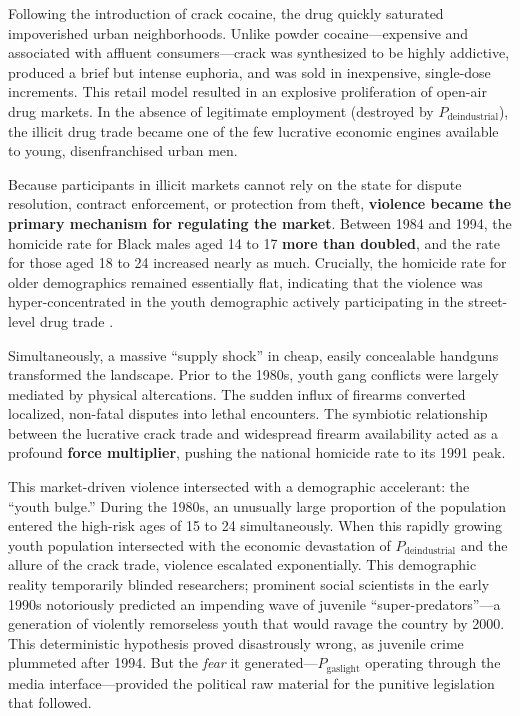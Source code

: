 \documentclass[12pt,openany]{book}
\begin{document}
Following the introduction of crack cocaine, the drug quickly saturated impoverished urban neighborhoods. Unlike powder cocaine---expensive and associated with affluent consumers---crack was synthesized to be highly addictive, produced a brief but intense euphoria, and was sold in inexpensive, single-dose increments. This retail model resulted in an explosive proliferation of open-air drug markets. In the absence of legitimate employment (destroyed by $P_{\text{deindustrial}}$), the illicit drug trade became one of the few lucrative economic engines available to young, disenfranchised urban men.

Because participants in illicit markets cannot rely on the state for dispute resolution, contract enforcement, or protection from theft, \textbf{violence became the primary mechanism for regulating the market}. Between 1984 and 1994, the homicide rate for Black males aged 14 to 17 \textbf{more than doubled}, and the rate for those aged 18 to 24 increased nearly as much. Crucially, the homicide rate for older demographics remained essentially flat, indicating that the violence was hyper-concentrated in the youth demographic actively participating in the street-level drug trade \cite{bjs_homicide_trends}.

Simultaneously, a massive ``supply shock'' in cheap, easily concealable handguns transformed the landscape. Prior to the 1980s, youth gang conflicts were largely mediated by physical altercations. The sudden influx of firearms converted localized, non-fatal disputes into lethal encounters. The symbiotic relationship between the lucrative crack trade and widespread firearm availability acted as a profound \textbf{force multiplier}, pushing the national homicide rate to its 1991 peak.

This market-driven violence intersected with a demographic accelerant: the ``youth bulge.'' During the 1980s, an unusually large proportion of the population entered the high-risk ages of 15 to 24 simultaneously. When this rapidly growing youth population intersected with the economic devastation of $P_{\text{deindustrial}}$ and the allure of the crack trade, violence escalated exponentially. This demographic reality temporarily blinded researchers; prominent social scientists in the early 1990s notoriously predicted an impending wave of juvenile ``super-predators''---a generation of violently remorseless youth that would ravage the country by 2000. This deterministic hypothesis proved disastrously wrong, as juvenile crime plummeted after 1994. But the \textit{fear} it generated---$P_{\text{gaslight}}$ operating through the media interface---provided the political raw material for the punitive legislation that followed.
\end{document}
